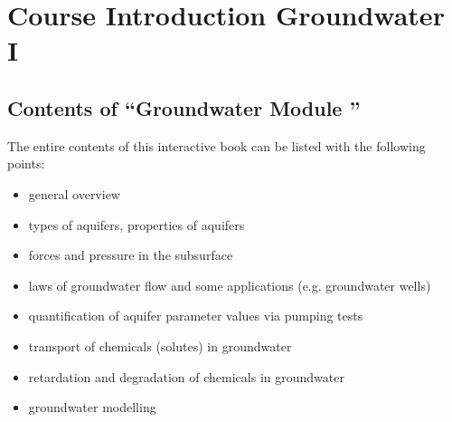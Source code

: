 \documentclass[letterpaper,10pt,english]{sphinxmanual}
\begin{document}
\section{Course Introduction \sphinxhyphen{} Groundwater I}
\label{\detokenize{contents/background/03_basic_hydrogeology:course-introduction-groundwater-i}}\label{\detokenize{contents/background/03_basic_hydrogeology::doc}}

\subsection{Contents of “Groundwater Module ”}
\label{\detokenize{contents/background/03_basic_hydrogeology:contents-of-groundwater-module}}
The entire contents of this interactive book can be listed with the following points:
\begin{itemize}
\item {} 
general overview

\item {} 
types of aquifers, properties of aquifers

\item {} 
forces and pressure in the subsurface

\item {} 
laws of groundwater flow and some applications (e.g. groundwater wells)

\item {} 
quantification of aquifer parameter values via pumping tests

\item {} 
transport of chemicals (solutes) in groundwater

\item {} 
retardation and degradation of chemicals in groundwater

\item {} 
groundwater modelling

\end{itemize}
\end{document}
